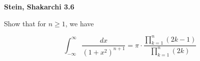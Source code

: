 \textbf{Stein, Shakarchi 3.6}

Show that for $n \ge 1$, we have

$$
  \int_{-\infty}^{\infty} {\frac{dx}{\left( 1 + x^2 \right)^{n+1}}} = \pi \cdot \frac{\prod\limits_{k=1}^{n} (2k - 1)}{\prod\limits_{k=1}^{n} (2k)}
$$

\begin{solution}
  \ \\
\end{solution}
